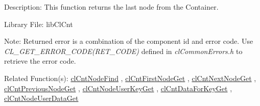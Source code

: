 \begin{Desc}
\item[Description:]This function returns the last node from the Container.\end{Desc}
\begin{Desc}
\item[Library File:]lib\-Cl\-Cnt\end{Desc}
\begin{Desc}
\item[Note:]Returned error is a combination of the component id and error code. Use \textit{CL\_\-GET\_\-ERROR\_\-CODE(RET\_\-CODE)} defined in \textit{clCommonErrors.h} to retrieve the error code.\end{Desc}
\begin{Desc}
\item[Related Function(s):]\hyperlink{pagecnt109}{cl\-Cnt\-Node\-Find} , \hyperlink{pagecnt110}{cl\-Cnt\-First\-Node\-Get} , 
\hyperlink{pagecnt112}{cl\-Cnt\-Next\-Node\-Get} , \hyperlink{pagecnt113}{cl\-Cnt\-Previous\-Node\-Get} , 
\hyperlink{pagecnt115}{cl\-Cnt\-Node\-User\-Key\-Get} , \hyperlink{pagecnt116}{cl\-Cnt\-Data\-For\-Key\-Get} , 
\hyperlink{pagecnt117}{cl\-Cnt\-Node\-User\-Data\-Get} \end{Desc}


\newpage
